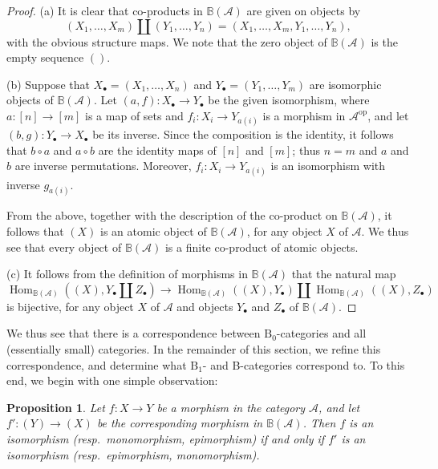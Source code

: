 \documentclass[12pt]{amsart}
\numberwithin{equation}{section}
\newtheorem{proposition}[equation]{Proposition}
\theoremstyle{definition}
\newcommand{\cA}{\mathcal{A}}
\newcommand{\rB}{\mathrm{B}}
\newcommand{\BB}{\mathbb{B}}
\DeclareMathOperator{\Hom}{Hom}
\newcommand{\op}{\mathrm{op}}
\begin{document}
\begin{proof}
(a) It is clear that co-products in $\BB(\cA)$ are given on objects by
\begin{displaymath}
(X_1, \ldots, X_m) \amalg (Y_1, \ldots, Y_n) = (X_1, \ldots, X_m, Y_1, \ldots, Y_n),
\end{displaymath}
with the obvious structure maps. We note that the zero object of $\BB(\cA)$ is the empty sequence $()$.

(b) Suppose that $X_{\bullet}=(X_1, \ldots, X_n)$ and $Y_{\bullet}=(Y_1, \ldots, Y_m)$ are isomorphic objects of $\BB(\cA)$. Let $(a,f) \colon X_{\bullet} \to Y_{\bullet}$ be the given isomorphism, where $a \colon [n] \to [m]$ is a map of sets and $f_i \colon X_i \to Y_{a(i)}$ is a morphism in $\cA^{\op}$, and let $(b,g) \colon Y_{\bullet} \to X_{\bullet}$ be its inverse. Since the composition is the identity, it follows that $b \circ a$ and $a \circ b$ are the identity maps of $[n]$ and $[m]$; thus $n=m$ and $a$ and $b$ are inverse permutations. Moreover, $f_i \colon X_i \to Y_{a(i)}$ is an isomorphism with inverse $g_{a(i)}$.

From the above, together with the description of the co-product on $\BB(\cA)$, it follows that $(X)$ is an atomic object of $\BB(\cA)$, for any object $X$ of $\cA$. We thus see that every object of $\BB(\cA)$ is a finite co-product of atomic objects.

(c) It follows from the definition of morphisms in $\BB(\cA)$ that the natural map
\begin{displaymath}
\Hom_{\BB(\cA)}((X), Y_{\bullet} \amalg Z_{\bullet}) \to \Hom_{\BB(\cA)}((X), Y_{\bullet}) \amalg \Hom_{\BB(\cA)}((X), Z_{\bullet})
\end{displaymath}
is bijective, for any object $X$ of $\cA$ and objects $Y_{\bullet}$ and $Z_{\bullet}$ of $\BB(\cA)$.
\end{proof}

We thus see that there is a correspondence between $\rB_0$-categories and all (essentially small) categories. In the remainder of this section, we refine this correspondence, and determine what $\rB_1$- and B-categories correspond to. To this end, we begin with one simple observation:

\begin{proposition} \label{prop:AB-epi-mono}
Let $f \colon X \to Y$ be a morphism in the category $\cA$, and let $f' \colon (Y) \to (X)$ be the corresponding morphism in $\BB(\cA)$. Then $f$ is an isomorphism (resp.\ monomorphism, epimorphism) if and only if $f'$ is an isomorphism (resp.\ epimorphism, monomorphism).
\end{proposition}
\end{document}
